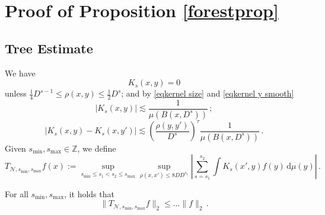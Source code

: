 \chapter{Proof of Proposition \ref{forestprop}}

\label{treesection}

\section{Tree Estimate}

We have
\begin{equation}
    \label{eq Ks supp t}
    K_s(x,y)=0
\end{equation}
unless $\frac{1}{4} D^{s-1} \leq \rho(x,y) \leq \frac{1}{2} D^s$; and by \eqref{eqkernel size} and \eqref{eqkernel y smooth}
\begin{equation}
   \label{eq Ks size t}
    |K_s(x,y)|\lesssim \frac{1}{\mu(B(x, D^{s}))}\,;
\end{equation}
\begin{equation}
    \label{eq Ks smooth t}
    |K_s(x,y)-K_s(x, y')|\lesssim \left(\frac{\rho(y,y')}{D^s}\right)^{\tau}\frac{1}{\mu(B(x, D^{s}))}\,.
\end{equation}
Given $s_{\min}, s_{\max} \in \mathbb{Z}$, we define
\begin{equation}
    \label{eq TN def}
    T_{\mathcal{N},s_{\min}, s_{\max}} f(x) := \sup_{s_{\min} \le s_1 < s_2 \le s_{\max}} \sup_{\rho(x,x') \leq 8 D D^{s_1}} \left| \sum_{s = s_1}^{s_2}  \int K_s(x',y) f(y)  \, \mathrm{d}\mu(y) \right|\,.
\end{equation}
\begin{lemma}
    \label{lem nontangential}
    For all $s_{\min}, s_{\max}$, it holds that
    $$
        \|T_{\mathcal{N},s_{\min}, s_{\max}} f\|_2 \le ...\|f\|_2\,.
    $$
\end{lemma}

